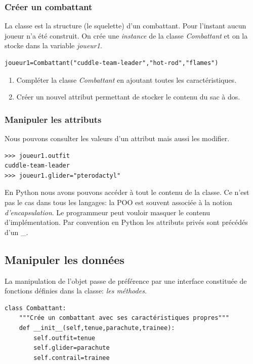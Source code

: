 \documentclass[a4paper,11pt]{article}
\begin{document}
\begin{Form}
\subsubsection{Créer un combattant}
La classe est la structure (le squelette) d'un combattant. Pour l'instant aucun joueur n'a été construit. On crée une \emph{instance} de la classe \emph{Combattant} et on la stocke dans la variable \emph{joueur1}.
\begin{lstlisting}
joueur1=Combattant("cuddle-team-leader","hot-rod","flames")
\end{lstlisting}
\begin{activite}
\begin{enumerate}
\item Compléter la classe \emph{Combattant} en ajoutant toutes les caractéristiques.
\item Créer un nouvel attribut permettant de stocker le contenu du sac à dos.
\end{enumerate}
\end{activite}
\subsubsection{Manipuler les attributs}
Nous pouvons consulter les valeurs d'un attribut mais aussi les modifier.
\begin{lstlisting}
>>> joueur1.outfit
cuddle-team-leader
>>> joueur1.glider="pterodactyl"
\end{lstlisting}

\begin{commentprof}
En Python nous avons pouvons accéder à tout le contenu de la classe. Ce n'est pas le cas dans tous les langages: la POO est souvent associée à la notion \emph{d'encapsulation}. Le programmeur peut vouloir masquer le contenu d'implémentation. Par convention en Python les attributs privés sont précédés d'un \_.
\end{commentprof}
\subsection{Manipuler les données}
La manipulation de l'objet passe de préférence par une interface constituée de fonctions définies dans la classe: \emph{les méthodes}.
\begin{lstlisting}
class Combattant:
	"""Crée un combattant avec ses caractéristiques propres"""
	def __init__(self,tenue,parachute,trainee):
		self.outfit=tenue
		self.glider=parachute
		self.contrail=trainee
	

\end{lstlisting}
\end{Form}
\end{document}
